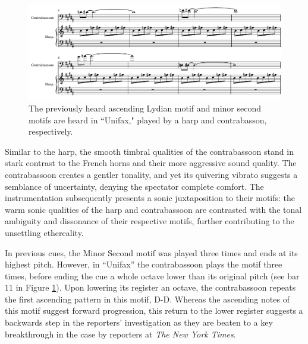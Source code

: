 \begin{figure}
    \centering
    \includegraphics[width=1\linewidth]{img/president-unifax.pdf}
    \caption{The previously heard ascending Lydian motif and minor second motifs are heard in ``Unifax," played by a harp and contrabasson, respectively.}
    \label{fig:president-unifax}
\end{figure}
Similar to the harp, the smooth timbral qualities of the contrabassoon stand in stark contrast to the French horns and their more aggressive sound quality.
The contrabassoon creates a gentler tonality, and yet its quivering vibrato suggests a semblance of uncertainty, denying the spectator complete comfort.
The instrumentation subsequently presents a sonic juxtaposition to their motifs: the warm sonic qualities of the harp and contrabassoon are contrasted with the tonal ambiguity and dissonance of their respective motifs, further contributing to the unsettling ethereality. 


In previous cues, the Minor Second motif was played three times and ends at its highest pitch.
However, in ``Unifax” the contrabassoon plays the motif three times, before ending the cue a whole octave lower than its original pitch (see bar 11 in Figure \ref{fig:president-unifax}).
Upon lowering its register an octave, the contrabassoon repeats the first ascending pattern in this motif, D-D\sharp.
Whereas the ascending notes of this motif suggest forward progression, this return to the lower register suggests a backwards step in the reporters’ investigation as they are beaten to a key breakthrough in the case by reporters at \textit{The New York Times}.


